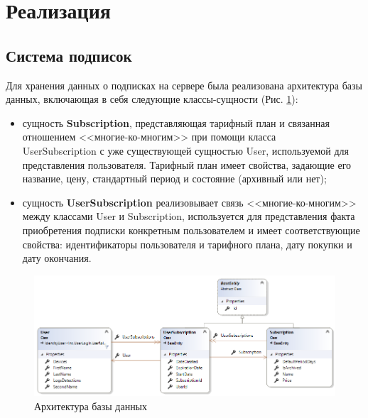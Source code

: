 \documentclass[14pt]{matmex-diploma-custom}
\begin{document}
\section*{Реализация}


\subsection*{Система подписок}

Для хранения данных о подписках на сервере была реализована архитектура базы данных, включающая в себя следующие классы-сущности (Рис. \ref{database}): 

\begin{itemize}  
\item сущность \textbf{Subscription}, представляющая тарифный план и связанная отношением <<многие-ко-многим>> при помощи класса\\ UserSubscription с уже существующей сущностью User, используемой для представления пользователя. Тарифный план имеет свойства, задающие его название, цену, стандартный период и состояние (архивный или нет);
\item сущность \textbf{UserSubscription} реализовывает связь <<многие-ко-многим>> между классами User и Subscription, используется для представления факта приобретения подписки конкретным пользователем и имеет соответствующие свойства: идентификаторы пользователя и тарифного плана, дату покупки и дату окончания.
\end{itemize}

\begin{figure}[h]
\centering
\includegraphics[width=\textwidth]{database.png}
\caption{Архитектура базы данных}
\label{database}
\end{figure}
\end{document}
